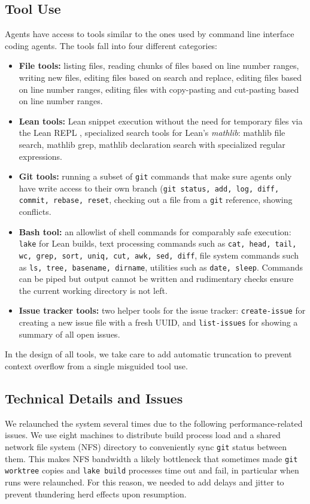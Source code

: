 \documentclass[]{fairmeta}
\begin{document}
\subsection{Tool Use}
Agents have access to tools similar to the ones used by command line interface coding agents. The tools fall into four different categories:
\begin{itemize}
    \item \textbf{File tools:} listing files, reading chunks of files based on line number ranges, writing new files, editing files based on search and replace, editing files based on line number ranges, editing files with copy-pasting and cut-pasting based on line number ranges.  
    \item \textbf{Lean tools:} Lean snippet execution without the need for temporary files via the Lean REPL \citep{morrison_repl}, specialized search tools for Lean's \emph{mathlib}: mathlib file search, mathlib grep, mathlib declaration search with specialized regular expressions.
    \item \textbf{Git tools:} running a subset of \texttt{git} commands that make sure agents only have write access to their own branch (\texttt{git status, add, log, diff, commit, rebase, reset}, checking out a file from a \texttt{git} reference, showing conflicts.
    \item \textbf{Bash tool:} an allowlist of shell commands for comparably safe execution: \texttt{lake} for Lean builds, text processing commands such as \texttt{cat, head, tail, wc, grep, sort, uniq, cut, awk, sed, diff}, file system commands such as \texttt{ls, tree, basename, dirname}, utilities such as \texttt{date, sleep}. Commands can be piped but output cannot be written and rudimentary checks ensure the current working directory is not left.
    \item \textbf{Issue tracker tools:} two helper tools for the issue tracker: \texttt{create-issue} for creating a new issue file with a fresh UUID, and \texttt{list-issues} for showing a summary of all open issues.
\end{itemize}
In the design of all tools, we take care to add automatic truncation to prevent context overflow from a single misguided tool use.

\subsection{Technical Details and Issues}
\label{sec:tech-issues}
We relaunched the system several times due to the following performance-related issues. We use eight machines to distribute build process load and a shared network file system (NFS) directory to conveniently sync \texttt{git} status between them. This makes NFS bandwidth a likely bottleneck that sometimes made \texttt{git worktree} copies and \texttt{lake build} processes time out and fail, in particular when runs were relaunched. For this reason, we needed to add delays and jitter to prevent thundering herd effects upon resumption. 
\end{document}

